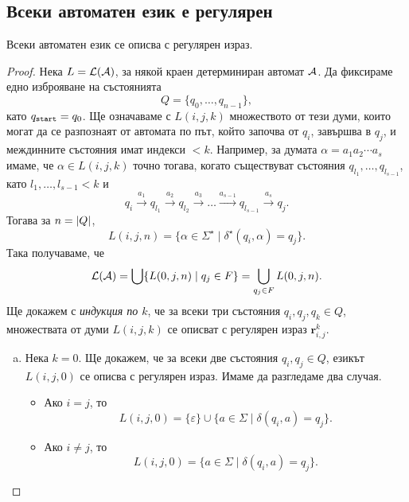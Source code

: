 \subsection{Всеки автоматен език е регулярен}
\begin{framed}
\begin{thm}
  \label{th:regular-kleene}
  Всеки автоматен език се описва с регулярен израз.
\end{thm}
\end{framed}
\begin{proof}
  Нека  $L = \mathcal{L}(\mathcal{A})$, за някой краен детерминиран автомат $\mathcal{A}$.
  Да фиксираме едно изброяване на състоянията
  \[Q = \{q_0,\dots,q_{n-1}\},\]
  като $q_{\texttt{start}} = q_0$.
  Ще означаваме с $L(i,j,k)$ множеството от тези думи, които
  могат да се разпознаят от автомата по път, който започва от $q_i$,
  завършва в $q_j$, и междинните състояния имат индекси $< k$.
  Например, за думата $\alpha = a_1a_2\cdots a_s$ имаме, че $\alpha \in L(i,j,k)$
  точно тогава, когато съществуват състояния $q_{l_1},\dots,q_{l_{s-1}}$, като $l_1,\dots,l_{s-1} < k$ и
  \[q_i\stackrel{a_1}{\rightarrow} q_{l_1} \stackrel{a_2}{\rightarrow} q_{l_2} \stackrel{a_3}{\rightarrow} \dots \stackrel{a_{s-1}}{\rightarrow} q_{l_{s-1}}\stackrel{a_s}{\rightarrow} q_j.\]
  Тогава за $n = \vert{Q}\vert$, 
  \[L(i,j,n) = \{\alpha\in\Sigma^\star\mid \delta^\star(q_i,\alpha) = q_j\}.\]
  Така получаваме, че 
  \[\mathcal{L}(\mathcal{A}) = \bigcup\{L(0,j,n)\mid q_j \in F\} = \bigcup_{q_j\in F}L(0,j,n).\]
  Ще докажем с {\em индукция по $k$}, че за всеки три състояния $q_i,q_j,q_k \in Q$, множествата от думи $L(i,j,k)$
  се описват с регулярен израз $\mathbf{r}^k_{i,j}$.
  \begin{enumerate}[a)]
  \item
    Нека $k = 0$. Ще докажем, че за всеки две състояния $q_i,q_j \in Q$, езикът $L(i,j,0)$ се описва с регулярен израз.
    Имаме да разгледаме два случая.
    \begin{itemize}
    \item
      Ако $i = j$, то 
      \begin{equation}
        \label{eq:kleene-equal}
        L(i, j, 0) = \{\varepsilon\}\cup\{a\in\Sigma \mid \delta(q_i,a) = q_j\}.
      \end{equation}
    \item
      Ако $i \neq j$, то
      \[L(i, j, 0) = \{a\in\Sigma \mid \delta(q_i, a) = q_j\}.\]      
    \end{itemize}

\end{enumerate}
\end{proof}
